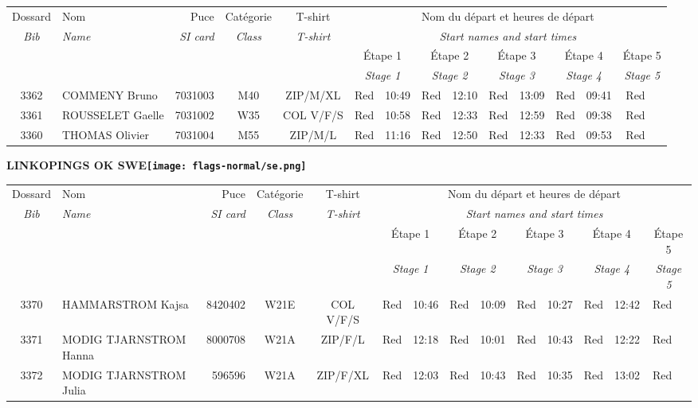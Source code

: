 \documentclass{report}
\begin{document}
  \begin{longtable}{|c|l|r|c|c|*{5}{cc|}}
    Dossard & Nom  & Puce    & Catégorie & T-shirt & \multicolumn{10}{c|}{Nom du départ et heures de départ} \\
    \itshape Bib     & \itshape Name & \itshape SI card & \itshape Class  & \itshape  T-shirt  & \multicolumn{10}{c|}{\itshape Start names and start times} \\
    \hline
    & & & & & \multicolumn{2}{c|}{Étape 1} & \multicolumn{2}{c|}{Étape 2} & \multicolumn{2}{c|}{Étape 3} & \multicolumn{2}{c|}{Étape 4} & \multicolumn{2}{c|}{Étape 5} \\
    & & & & & \multicolumn{2}{c|}{\itshape Stage 1} & \multicolumn{2}{c|}{\itshape Stage 2} & \multicolumn{2}{c|}{\itshape Stage 3} & \multicolumn{2}{c|}{\itshape Stage 4} & \multicolumn{2}{c|}{\itshape Stage 5} \\
    \hline
    3362 & COMMENY Bruno & 7031003 & M40 & ZIP/M/XL & Red & 10:49 & Red & 12:10 & Red & 13:09 & Red & 09:41 & Red &  \\
    3361 & ROUSSELET Gaelle & 7031002 & W35 & COL V/F/S & Red & 10:58 & Red & 12:33 & Red & 12:59 & Red & 09:38 & Red &  \\
    3360 & THOMAS Olivier & 7031004 & M55 & ZIP/M/L & Red & 11:16 & Red & 12:50 & Red & 12:33 & Red & 09:53 & Red &  \\
  \end{longtable}
\newpage
  \Huge \centering \bfseries LINKOPINGS OK  SWE\normalfont \footnotesize \sffamily \hfill \texttt{[image: flags-normal/se.png]} \newline 
  \begin{longtable}{|c|l|r|c|c|*{5}{cc|}}
    Dossard & Nom  & Puce    & Catégorie & T-shirt & \multicolumn{10}{c|}{Nom du départ et heures de départ} \\
    \itshape Bib     & \itshape Name & \itshape SI card & \itshape Class  & \itshape  T-shirt  & \multicolumn{10}{c|}{\itshape Start names and start times} \\
    \hline
    & & & & & \multicolumn{2}{c|}{Étape 1} & \multicolumn{2}{c|}{Étape 2} & \multicolumn{2}{c|}{Étape 3} & \multicolumn{2}{c|}{Étape 4} & \multicolumn{2}{c|}{Étape 5} \\
    & & & & & \multicolumn{2}{c|}{\itshape Stage 1} & \multicolumn{2}{c|}{\itshape Stage 2} & \multicolumn{2}{c|}{\itshape Stage 3} & \multicolumn{2}{c|}{\itshape Stage 4} & \multicolumn{2}{c|}{\itshape Stage 5} \\
    \hline
    3370 & HAMMARSTROM Kajsa & 8420402 & W21E & COL V/F/S & Red & 10:46 & Red & 10:09 & Red & 10:27 & Red & 12:42 & Red &  \\
    3371 & MODIG TJARNSTROM Hanna & 8000708 & W21A & ZIP/F/L & Red & 12:18 & Red & 10:01 & Red & 10:43 & Red & 12:22 & Red &  \\
    3372 & MODIG TJARNSTROM Julia & 596596 & W21A & ZIP/F/XL & Red & 12:03 & Red & 10:43 & Red & 10:35 & Red & 13:02 & Red &  \\
  \end{longtable}
\end{document}
